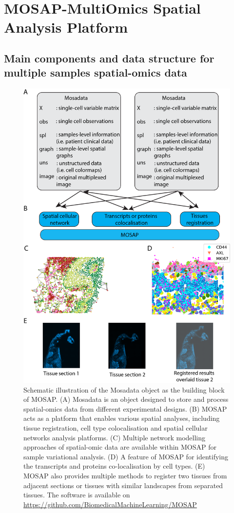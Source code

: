 \section{MOSAP-MultiOmics Spatial Analysis Platform}
\label{Sec:4.2_Methods}
\subsection{Main components and data structure for multiple samples spatial-omics data}

\begin{figure}
    \centering
    \includegraphics[width=0.8\columnwidth]{Chapter4/Figures/Chap4_MOSAP_DS.png}
    \caption[Schematic illustration of the Mosadata object as the building block of MOSAP]{Schematic illustration of the Mosadata object as the building block of MOSAP. (A) Mosadata is an object designed to store and process spatial-omics data from different experimental designs. (B) MOSAP acts as a platform that enables various spatial analyses, including tissue registration, cell type colocalisation and spatial cellular networks analysis platforms. (C) Multiple network modelling approaches of spatial-omic data are available within MOSAP for sample variational analysis. (D) A feature of MOSAP for identifying the transcripts and proteins co-localisation by cell types. (E) MOSAP also provides multiple methods to register two tissues from adjacent sections or tissues with similar landscapes from separated tissues. The software is available on  \href{Github}{https://github.com/BiomedicalMachineLearning/MOSAP}}
    \label{Chap4:fig:MOSAP_OOP}
\end{figure}

